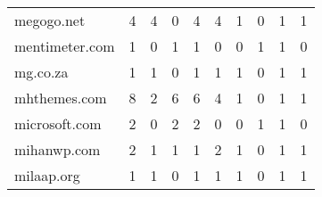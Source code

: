 \begin{tabular}{lrrrrrrrrr}
                 megogo.net &                                4 &                                  4 &                                      0 &                            4 &                           4 &                                   1 &                                      0 &                             1 &                            1 \\
             mentimeter.com &                                1 &                                  0 &                                      1 &                            1 &                           0 &                                   0 &                                      1 &                             1 &                            0 \\
                   mg.co.za &                                1 &                                  1 &                                      0 &                            1 &                           1 &                                   1 &                                      0 &                             1 &                            1 \\
               mhthemes.com &                                8 &                                  2 &                                      6 &                            6 &                           4 &                                   1 &                                      0 &                             1 &                            1 \\
              microsoft.com &                                2 &                                  0 &                                      2 &                            2 &                           0 &                                   0 &                                      1 &                             1 &                            0 \\
                mihanwp.com &                                2 &                                  1 &                                      1 &                            1 &                           2 &                                   1 &                                      0 &                             1 &                            1 \\
                 milaap.org &                                1 &                                  1 &                                      0 &                            1 &                           1 &                                   1 &                                      0 &                             1 &                            1 \\

\end{tabular}
